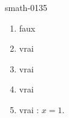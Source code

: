 
\begin{corrige}{smath-0135}

    \begin{enumerate}
        \item
            faux
        \item
            vrai
        \item
            vrai
        \item
            vrai
        \item
            vrai : \( x=1\).
    \end{enumerate}

\end{corrige}
